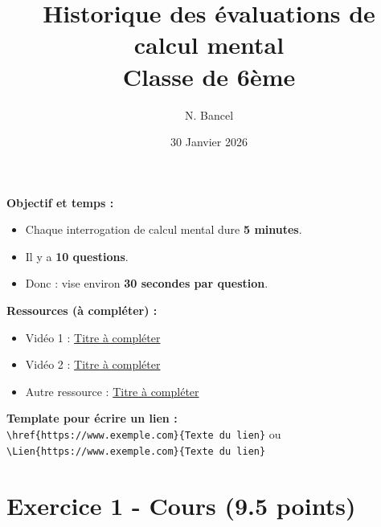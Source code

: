\documentclass[answers]{exam}
\title{Historique des évaluations de calcul mental \\ Classe de 6ème}
\author{N. Bancel}
\date{30 Janvier 2026}
\begin{document}
{\let\newpage\relax\maketitle}

\begin{Indication}
\textbf{Objectif et temps :}
\begin{itemize}
  \item Chaque interrogation de calcul mental dure \textbf{5 minutes}.
  \item Il y a \textbf{10 questions}.
  \item Donc : vise environ \textbf{30 secondes par question}.
\end{itemize}

\textbf{Ressources (à compléter) :}
\begin{itemize}
  \item Vidéo 1 : \href{https://www.exemple.com}{Titre à compléter}
  \item Vidéo 2 : \href{https://www.exemple.com}{Titre à compléter}
  \item Autre ressource : \href{https://www.exemple.com}{Titre à compléter}
\end{itemize}

\textbf{Template pour écrire un lien :}\\
\verb|\href{https://www.exemple.com}{Texte du lien}| \quad ou \quad \verb|\Lien{https://www.exemple.com}{Texte du lien}|
\end{Indication}

\vspace{3mm}

\section*{Exercice 1 - Cours (9.5 points)}
\end{document}
